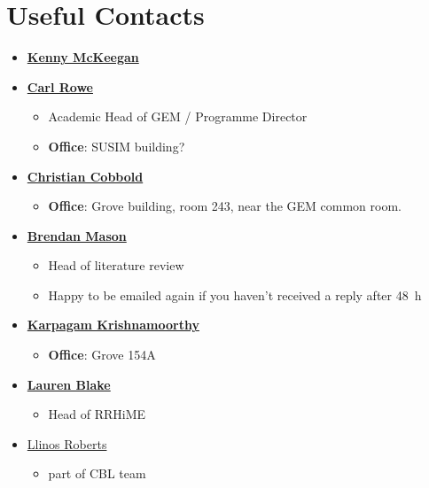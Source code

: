 \chapter{Useful Contacts}

\begin{itemize}
    \item \href{mailto:Kenneth.mckeegan@swansea.ac.uk}{\textbf{Kenny McKeegan}}
    \item \href{mailto:v.c.rowe@swansea.ac.uk}{\textbf{Carl Rowe}}
        \begin{itemize}
            \item Academic Head of GEM / Programme Director
            \item \textbf{Office}: SUSIM building?
        \end{itemize}
    \item \href{mailto:Christian.Cobbold@Swansea.ac.uk}{\textbf{Christian Cobbold}}
        \begin{itemize}
            \item \textbf{Office}: Grove building, room 243, near the GEM common room.
        \end{itemize}
  \item \href{mailto:b.w.mason@swansea.ac.uk}{\textbf{Brendan Mason}}
    \begin{itemize}
    \item Head of literature review
      \item Happy to be emailed again if you haven't received a reply after \SI{48}{\hour}
    \end{itemize}
    \item \href{mailto:k.krishnamoorthy@swansea.ac.uk}{\textbf{Karpagam Krishnamoorthy}}
    \begin{itemize}
        \item  \textbf{Office}: Grove 154A
    \end{itemize}
    \item \href{mailto:l.v.blake@swansea.ac.uk:}{\textbf{Lauren Blake}}
     \begin{itemize}
        \item  Head of RRHiME
    \end{itemize}
    \item \href{mailto:l.roberts@swansea.ac.uk}{Llinos Roberts}
    \begin{itemize}
        \item part of CBL team
    \end{itemize}
\end{itemize}
